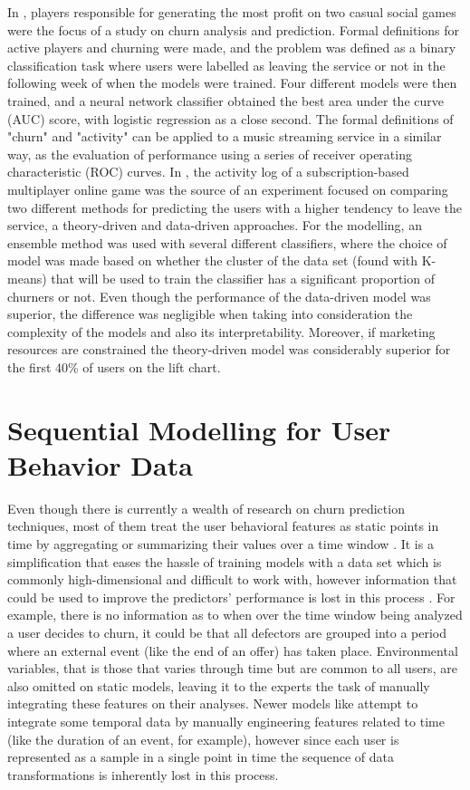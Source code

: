 \documentclass{kththesis}
\begin{document}
In \citep{Runge2014}, players responsible for generating the most profit on two casual social games were the focus of a study on churn analysis and prediction. Formal definitions for active players and churning were made, and the problem was defined as a binary classification task where users were labelled as leaving the service or not in the following week of when the models were trained. Four different models were then trained, and a neural network classifier obtained the best area under the curve (AUC) score, with logistic regression as a close second. The formal definitions of "churn" and "activity" can be applied to a music streaming service in a similar way, as the evaluation of performance using a series of receiver operating characteristic (ROC) curves. In \citep{Borbora2011}, the activity log of a subscription-based multiplayer online game was the source of an experiment focused on comparing two different methods for predicting the users with a higher tendency to leave the service, a theory-driven and data-driven approaches. For the modelling, an ensemble method was used with several different classifiers, where the choice of model was made based on whether the cluster of the data set (found with K-means) that will be used to train the classifier has a significant proportion of churners or not. Even though the performance of the data-driven model was superior, the difference was negligible when taking into consideration the complexity of the models and also its interpretability. Moreover, if marketing resources are constrained the theory-driven model was considerably superior for the first 40\% of users on the lift chart. 


\section{Sequential Modelling for User Behavior Data}

Even though there is currently a wealth of research on churn prediction techniques, most of them treat the user behavioral features as static points in time by aggregating or summarizing their values over a time window \citep{Auon2015}. It is a simplification that eases the hassle of training models with a data set which is commonly high-dimensional and difficult to work with, however information that could be used to improve the predictors' performance is lost in this process  \citep{GurAli2014}. For example, there is no information as to when over the time window being analyzed a user decides to churn, it could be that all defectors are grouped into a period where an external event (like the end of an offer) has taken place. Environmental variables, that is those that varies through time but are common to all users, are also omitted on static models, leaving it to the experts the task of manually integrating these features on their analyses. Newer models like \citep{Pudipeddi2014} attempt to integrate some temporal data by manually engineering features related to time (like the duration of an event, for example), however since each user is represented as a sample in a single point in time the sequence of data transformations is inherently lost in this process.
\end{document}
